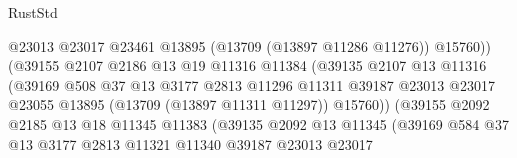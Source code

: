 \begin{lexlean}{RustStd}
\begin{coremodule}
                                        @23013
                                        @23017
                                        @23461
                                        @13895
                                        (@13709 (@13897 @11286 @11276))
                                        @15760))
                                    (@39155
                                      @2107
                                      @2186
                                      @13
                                      @19
                                      @11316
                                      @11384
                                      (@39135
                                        @2107
                                        @13
                                        @11316
                                        (@39169
                                          @508
                                          @37
                                          @13
                                          @3177
                                          @2813
                                          @11296
                                          @11311
                                          @39187
                                          @23013
                                          @23017
                                          @23055
                                          @13895
                                          (@13709 (@13897 @11311 @11297))
                                          @15760))
                                      (@39155
                                        @2092
                                        @2185
                                        @13
                                        @18
                                        @11345
                                        @11383
                                        (@39135
                                          @2092
                                          @13
                                          @11345
                                          (@39169
                                            @584
                                            @37
                                            @13
                                            @3177
                                            @2813
                                            @11321
                                            @11340
                                            @39187
                                            @23013
                                            @23017

\end{coremodule}
\end{lexlean}
